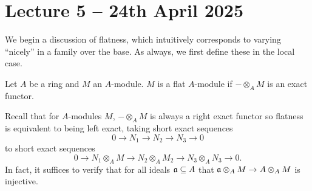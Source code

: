 \section{Lecture 5 -- 24th April 2025}\label{sec: lecture 5}
We begin a discussion of flatness, which intuitively corresponds to varying ``nicely'' in a family over the base. As always, we first define these in the local case. 
\begin{definition}\label{def: flat module}
    Let $A$ be a ring and $M$ an $A$-module. $M$ is a flat $A$-module if $-\otimes_{A}M$ is an exact functor. 
\end{definition}
Recall that for $A$-modules $M$, $-\otimes_{A}M$ is always a right exact functor so flatness is equivalent to being left exact, taking short exact sequences 
$$0\to N_{1}\to N_{2}\to N_{3}\to 0$$
to short exact sequences
$$0\to N_{1}\otimes_{A}M\to N_{2}\otimes_{A}M_{2}\to N_{3}\otimes_{A}N_{3}\to0.$$
In fact, it suffices to verify that for all ideals $\mathfrak{a}\subseteq A$ that $\mathfrak{a}\otimes_{A}M\to A\otimes_{A}M$ is injective. 

